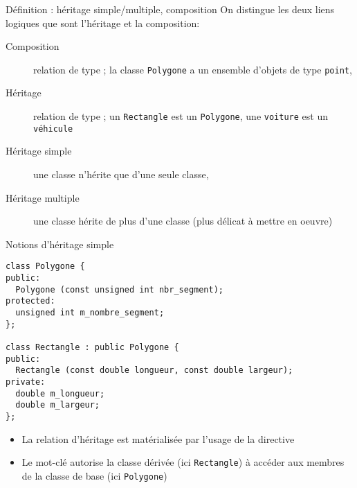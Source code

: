 \documentclass[c]{beamer}
\begin{document}
\begin{frame}[fragile]{Définition : héritage simple/multiple, composition}
 On distingue les deux liens logiques que sont l'héritage et la
composition:

\begin{description}
\item[{Composition}] relation de type ; la classe \texttt{Polygone} a
un ensemble d'objets de type \texttt{point}, 
\item[{Héritage}] relation de type ; un \texttt{Rectangle} est un
\texttt{Polygone}, une \texttt{voiture} est un \texttt{véhicule} 
\end{description}

\bigskip

\begin{description}
\item[{Héritage simple}] une classe n'hérite que d'une seule classe, 
\item[{Héritage multiple}] une classe hérite de plus d'une classe (plus délicat à mettre en oeuvre) 
\end{description}

\end{frame}





\begin{frame}[fragile]{Notions d'héritage simple}
 \begin{verbatim}
class Polygone {
public:
  Polygone (const unsigned int nbr_segment); 
protected:
  unsigned int m_nombre_segment;
};

class Rectangle : public Polygone {
public:
  Rectangle (const double longueur, const double largeur);
private:
  double m_longueur;
  double m_largeur;
};
\end{verbatim}

\pause
\begin{itemize}
\item La relation d'héritage est matérialisée par l'usage de la directive 
\end{itemize}
\pause
\begin{itemize}
\item Le mot-clé  autorise la classe dérivée (ici \texttt{Rectangle}) à accéder
aux membres de la classe de base (ici \texttt{Polygone})
\end{itemize}
\end{frame}
\end{document}
